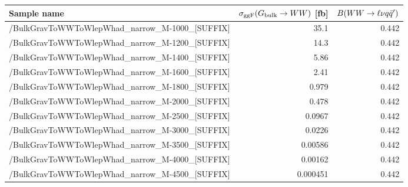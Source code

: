 \scriptsize
\begin{tabular}{lrr}
  \hline
  \textbf{Sample name} & $\sigma_{\mathrm{ggF}}(G_\mathrm{bulk}\to WW)$ [fb] & $B(WW\to\ell\nu q\bar{q}')$ \\
  \hline
  \ttfamily /BulkGravToWWToWlepWhad\_narrow\_M-1000\_[SUFFIX] & 35.1 & 0.442  \\
  \ttfamily /BulkGravToWWToWlepWhad\_narrow\_M-1200\_[SUFFIX] & 14.3 & 0.442  \\
  \ttfamily /BulkGravToWWToWlepWhad\_narrow\_M-1400\_[SUFFIX] & 5.86 & 0.442  \\
  \ttfamily /BulkGravToWWToWlepWhad\_narrow\_M-1600\_[SUFFIX] & 2.41 & 0.442  \\
  \ttfamily /BulkGravToWWToWlepWhad\_narrow\_M-1800\_[SUFFIX] & 0.979 & 0.442  \\
  \ttfamily /BulkGravToWWToWlepWhad\_narrow\_M-2000\_[SUFFIX] & 0.478 & 0.442  \\
  \ttfamily /BulkGravToWWToWlepWhad\_narrow\_M-2500\_[SUFFIX] & 0.0967 & 0.442  \\
  \ttfamily /BulkGravToWWToWlepWhad\_narrow\_M-3000\_[SUFFIX] & 0.0226 & 0.442  \\
  \ttfamily /BulkGravToWWToWlepWhad\_narrow\_M-3500\_[SUFFIX] & 0.00586 & 0.442  \\
  \ttfamily /BulkGravToWWToWlepWhad\_narrow\_M-4000\_[SUFFIX] & 0.00162 & 0.442  \\
  \ttfamily /BulkGravToWWToWlepWhad\_narrow\_M-4500\_[SUFFIX] & 0.000451 & 0.442  \\
  \hline
\end{tabular}
